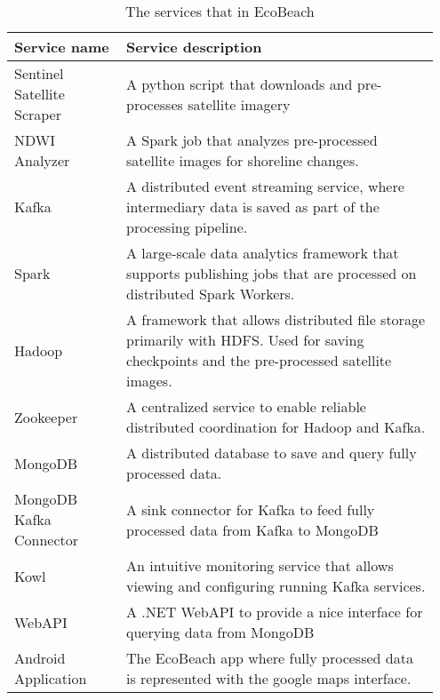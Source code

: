 \begin{table}[]
    \centering
    \begin{tabular}{| p{0.25\linewidth} | p{0.7\linewidth} |}
        \hline
        \textbf{Service name}      & \textbf{Service description}                                                                                                              \\ \hline
        Sentinel Satellite Scraper & A python script that downloads and pre-processes satellite imagery                                                                        \\\hline
        NDWI Analyzer              & A Spark job that analyzes pre-processed satellite images for shoreline changes.                                                           \\\hline
        Kafka                      & A distributed event streaming service, where intermediary data is saved as part of the processing pipeline.                               \\\hline
        Spark                      & A large-scale data analytics framework that supports publishing jobs that are processed on distributed Spark Workers.                     \\\hline
        Hadoop                     & A framework that allows distributed file storage primarily with HDFS. Used for saving checkpoints and the pre-processed satellite images. \\\hline
        Zookeeper                  & A centralized service to enable reliable distributed coordination for Hadoop and Kafka.                                                   \\\hline
        MongoDB                    & A distributed database to save and query fully processed data.                                                                            \\\hline
        MongoDB Kafka Connector    & A sink connector for Kafka to feed fully processed data from Kafka to MongoDB                                                             \\\hline
        Kowl                       & An intuitive monitoring service that allows viewing and configuring running Kafka services.                                               \\\hline
        WebAPI                     & A .NET WebAPI to provide a nice interface for querying data from MongoDB                                                                  \\\hline
        Android Application        & The EcoBeach app where fully processed data is represented with the google maps interface.                                                \\\hline
    \end{tabular}
    \caption{The services that in EcoBeach}
    \label{tab:ecobeach-services}
\end{table}

